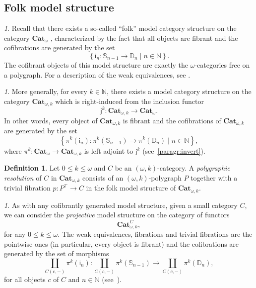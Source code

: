 \documentclass[reqno]{amsart}
\theoremstyle{plain}
\theoremstyle{definition}
\newtheorem{definition}[subsubsection]{Definition}
\theoremstyle{remark}
\newtheorem{paragr}[subsubsection]{} %
\newcommand{\nmbr}[1]{\mathbb #1}
\newcommand{\N}{\nmbr{N}}
\newcommand{\setof}[2]{\left\{ #1\; | \; #2\right\}}
\newcommand{\pair}[2]{(#1,#2)}       %
\newcommand{\homset}[3]{#1(#2,#3)} %
\newcommand{\ctg}[1]{\mathbf{#1}}  %
\newcommand{\Cat}{\ctg{Cat}}   %
\newcommand{\nCat}[1]{\Cat_{#1}}  %
\newcommand{\opCat}[1]{\Cat_{\omega,#1}} %
\newcommand{\funopCat}[2]{\Cat_{\omega,#1}^{#2}} %
\newcommand{\oCat}{\nCat{\omega}} %
\newcommand{\functor}[1]{\mathsf{#1}} %
\newcommand{\emb}[2]{\functor{j}_{#2}^{#1}}%
\newcommand{\pifun}[2]{\functor{\pi}_{#2}^{#1}}%
\newcommand{\oemb}[1]{\emb{#1}{}}%
\newcommand{\opifun}[1]{\pifun{#1}{}}%
\newcommand{\frgp}[1]{#1^\top} %
\newcommand{\oo}{\ensuremath{\omega}}
\newcommand{\ook}[1]{\ensuremath{\pair{\omega}{#1}}}
\newcommand{\Sph}[1]{\mathbb{S}_{#1}} %
\newcommand{\Dsk}[1]{\mathbb{D}_{#1}} %
\newcommand{\gcof}[1]{\functor{i}_{#1}} %
\newcommand{\nbd}{\nobreakdash} %
\begin{document}
\subsection{Folk model structure}
\begin{paragr}\label{paragr:folk}
  Recall that there exists a so-called ``folk'' model category
  structure on the category $\oCat$ \cite{lafontetal:folkms}, characterized by the fact that
  all objects are fibrant and the cofibrations are generated by the
  set 
  \[
    \setof{\gcof{n}:\Sph {n-1} \to \Dsk n }{n \in \N}.
  \]
  The cofibrant objects of this model structure are exactly the
  \oo\nbd-categories free on a polygraph. For a description of the
  weak equivalences, see \cite[Theorem 6.19]{lafontetal:folkms}. 
\end{paragr}
\begin{paragr}
  More generally, for every $k \in \N$, there exists a model
  category structure on the category $\opCat{k}$ \cite{ara_lucas:folmon} which is
  right-induced from the inclusion functor
  \[
    \oemb k:\opCat{k} \to \oCat.
  \]
  In other words, every object of $\opCat{k}$ is fibrant and the cofibrations of $\opCat{k}$ are generated
  by the set 
  \[
    \setof{\opifun{k}(\gcof{n}):\opifun{k}(\Sph {n-1}) \to \opifun{k}(\Dsk n) }{n \in \N},
  \]
  where $\opifun{k} \colon \oCat \to \opCat{k}$ is left adjoint to
  $\oemb k$ (see~\cref{paragr:invert}).
\end{paragr}
\begin{definition}\label{def:respol}
  Let $0 \leq k\leq \oo$ and $C$ be an $\ook k$-category. A {\em
  polygraphic resolution} of $C$ in $\opCat k$ consists of an
$\ook k$-polygraph $P$ together with a trivial fibration
$p:\frgp P\to C$
in the folk model structure of $\opCat k$.
\end{definition}
\begin{paragr}\label{paragr:projcof}
  As with any cofibrantly generated model structure, given a small
  category $C$, we can consider the \emph{projective} model structure
  on the category of functors
  \[
    \funopCat{k}{C},
  \]
  for any $0 \leq k \leq \oo$. The weak equivalences, fibrations
  and trivial fibrations are the pointwise ones (in particular, every
  object is fibrant) and the cofibrations are generated by the set of
  morphisms
  \[
   \coprod_{\homset{C}{c}{-}}\opifun{k}(\gcof{n}): \coprod_{\homset{C}{c}{-}}\opifun{k}(\Sph{n-1}) \to \coprod_{\homset{C}{c}{-}}\opifun{k}(\Dsk{n}),
  \]
  for all objects $c$ of $C$ and $n \in \N$ (see~\cite[Theorem 11.6.1]{hirschhorn:modctl}).
\end{paragr}
\end{document}
